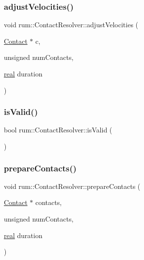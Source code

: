 \mbox{\label{classrum_1_1_contact_resolver_a9a76b0e81743999eea3c0ec882960d4c}} 
\subsubsection{\texorpdfstring{adjust\+Velocities()}{adjustVelocities()}}
{\footnotesize\ttfamily void rum\+::\+Contact\+Resolver\+::adjust\+Velocities (\begin{DoxyParamCaption}\item[{\hyperlink{classrum_1_1_contact}{Contact} $\ast$}]{c,  }\item[{unsigned}]{num\+Contacts,  }\item[{\hyperlink{namespacerum_a7e8cca23573d5eaead0f138cbaa4862c}{real}}]{duration }\end{DoxyParamCaption})}

\mbox{\label{classrum_1_1_contact_resolver_ab5331d0189d4d9fe1c17622638a8b0e5}} 
\subsubsection{\texorpdfstring{is\+Valid()}{isValid()}}
{\footnotesize\ttfamily bool rum\+::\+Contact\+Resolver\+::is\+Valid (\begin{DoxyParamCaption}{ }\end{DoxyParamCaption})}

\mbox{\label{classrum_1_1_contact_resolver_aa1171defbfc3b06d84a7221666198aaf}} 
\subsubsection{\texorpdfstring{prepare\+Contacts()}{prepareContacts()}}
{\footnotesize\ttfamily void rum\+::\+Contact\+Resolver\+::prepare\+Contacts (\begin{DoxyParamCaption}\item[{\hyperlink{classrum_1_1_contact}{Contact} $\ast$}]{contacts,  }\item[{unsigned}]{num\+Contacts,  }\item[{\hyperlink{namespacerum_a7e8cca23573d5eaead0f138cbaa4862c}{real}}]{duration }\end{DoxyParamCaption})}

